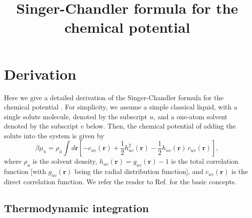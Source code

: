 \documentclass[12pt]{article}
\begin{document}
\newcommand{\vct}[1]{\mathbf{#1}}
\newcommand{\vr}{\vct{r}}
\newcommand{\vrN}{\mathbf{r}^N}
\newcommand{\vrn}{\mathbf{r}^n}
\newcommand{\plam}{\partial_\lambda}
\newcommand{\pbet}{\partial_\beta}



\title{Singer-Chandler formula for the chemical potential}
\date{}
\maketitle



\section{Derivation}

Here we give a detailed derivation of the Singer-Chandler formula
  for the chemical potential \cite{singer}.
For simplicity, we assume a simple classical liquid,
  with a single solute molecule, denoted by the subscript $u$,
  and a one-atom solvent denoted by the subscript $v$ below.
Then, the chemical potential of adding the solute into
  the system is given by
%
\begin{equation}
\beta \mu_u
  =
  \rho_u \int d\vr
  \left[
    - c_{uv}(\vr)
    + \frac{1}{2} h_{uv}^2(\vr)
    - \frac{1}{2} h_{uv}(\vr) \, c_{uv}(\vr)
  \right],
  \label{eq:singer}
\end{equation}
%
where $\rho_u$ is the solvent density,
  $h_{uv}(\vr) = g_{uv}(\vr) - 1$ is the total correlation function
  [with $g_{uv}(\vr)$ being the radial distribution function],
and $c_{uv}(\vr)$ is the direct correlation function.
We refer the reader to Ref. \cite{hansen}
  for the basic concepts.
%



\subsection{Thermodynamic integration}
\end{document}
